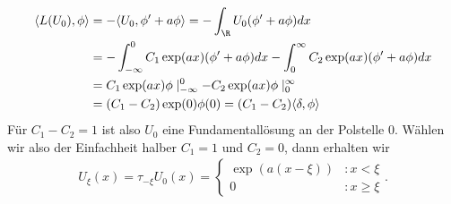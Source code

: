 \begin{solution}
\begin{enumerate}[label = (\roman*)]
  \begin{align*}
    \langle L(U_0), \phi \rangle
    &= -\langle U_0, \phi^{\prime} + a\phi \rangle
  = -\int_{\R}U_0(\phi^{\prime} + a\phi)dx \\
  &= -\int_{-\infty}^0C_1\exp(ax)(\phi^{\prime} + a\phi)dx
  -\int_0^{\infty}C_2\exp(ax)(\phi^{\prime} + a\phi)dx \\
  &= C_1\exp(ax)\phi\mid_{-\infty}^0 - C_2\exp(ax)\phi\mid_{0}^{\infty}\\
  &= (C_1-C_2)\exp(0)\phi(0) = (C_1 - C_2)\langle \delta, \phi \rangle
  \end{align*}
  Für $C_1 - C_2 = 1$ ist also $U_0$ eine Fundamentallösung
  an der Polstelle $0$. Wählen wir also der Einfachheit halber $C_1 = 1$ und $C_2 = 0$, dann erhalten wir
  \begin{align*}
    U_{\xi}(x) = \tau_{-\xi}U_0(x) =
    \begin{cases}
      \exp(a(x-\xi)) &: x < \xi \\
      0 &: x \geq \xi
    \end{cases}.
  \end{align*}
\end{enumerate}


\end{solution}

